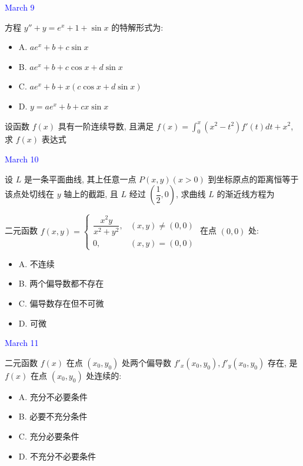 \textcolor{blue}{March 9}

\begin{example}[][Exam: 29.2.3]
	方程 $y''+y=e^{x}+1+\sin x$ 的特解形式为:
\begin{itemize}
	\item A. $ae^{x}+b+c\sin x$
	\item B. $ae^{x}+b+c\cos x+d\sin x$
	\item C. $ae^{x}+b+x(c\cos x+d\sin x)$
	\item D. $y=ae^{x}+b+cx\sin x$
\end{itemize}
\end{example}

\begin{example}[][Exam: 29.2.4]
	设函数 $f(x)$ 具有一阶连续导数, 且满足 $f(x)=\int_{0}^{x}(x^{2}-t^{2})f'(t)dt+x^{2}$, 求 $f(x)$ 表达式
\end{example}

\textcolor{blue}{March 10}

\begin{example}[][Exam: 29.2.5]
	设 $L$ 是一条平面曲线, 其上任意一点 $P(x,y)(x>0)$ 到坐标原点的距离恒等于该点处切线在 $y$ 轴上的截距, 且 $L$ 经过 $(\dfrac{1}{2},0)$, 求曲线 $L$ 的渐近线方程为
\end{example}

\begin{example}[][Exam: 29.2.6]
	二元函数 $f(x,y)=
\begin{cases}
	\dfrac{x^{2}y}{x^{2}+y^{2}},&(x,y)\neq (0,0)\\
	0,&(x,y)=(0,0)
\end{cases}$ 在点 $(0,0)$ 处:
\begin{itemize}
	\item A. 不连续
	\item B. 两个偏导数都不存在
	\item C. 偏导数存在但不可微
	\item D. 可微
\end{itemize}
\end{example}

\textcolor{blue}{March 11}

\begin{example}[][Exam: 29.2.7]
	二元函数 $f(x)$ 在点 $(x_{0},y_{0})$ 处两个偏导数 $f'_{x}(x_{0},y_{0}),f'_{y}(x_{0},y_{0})$ 存在, 是 $f(x)$ 在点 $(x_{0},y_{0})$ 处连续的:
\begin{itemize}
	\item A. 充分不必要条件
	\item B. 必要不充分条件
	\item C. 充分必要条件
	\item D. 不充分不必要条件
\end{itemize}
\end{example}

